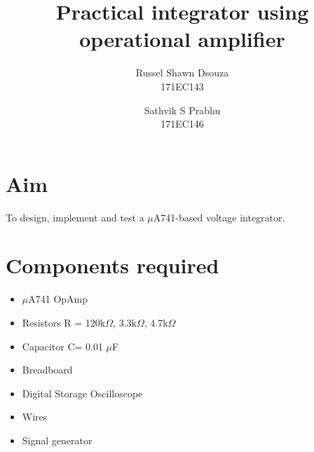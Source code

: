 \documentclass[12pt, titlepage]{article}
\title{\textbf{Practical integrator using operational amplifier}}
\author{
  Russel Shawn Dsouza\\
  171EC143
  \and
  Sathvik S Prabhu\\
  171EC146
}
\date{}
\theoremstyle{definition}
\begin{document}
  \maketitle

  \tableofcontents

  \newpage
  \section{Aim}
  To design, implement and test a $\mu$A741-based voltage integrator.


  \section*{Components required}
    \begin{itemize}
      \item $\mu$A741 OpAmp
      \item Resistors R = 120k$\Omega$, 3.3k$\Omega$, 4.7k$\Omega$
      \item Capacitor C= 0.01 $\mu$F
      \item Breadboard
      \item Digital Storage Oscilloscope
      \item Wires
      \item Signal generator
    \end{itemize}
\end{document}
